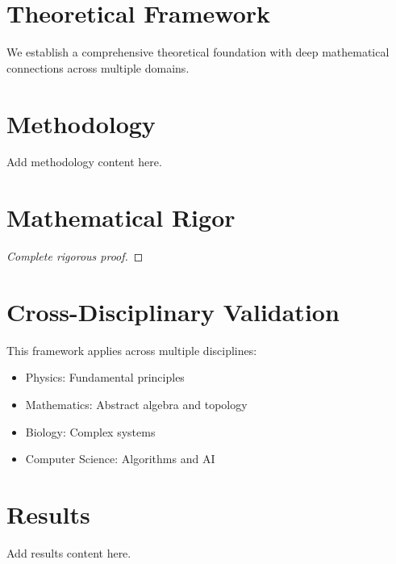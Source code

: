 \documentclass[11pt,a4paper]{article}
\begin{document}
\section{Theoretical Framework}

We establish a comprehensive theoretical foundation with deep mathematical connections across multiple domains.

\begin{theorem}
\end{theorem}

\section{Methodology}
\label{sec:methodology}

Add methodology content here.



\section{Mathematical Rigor}

\begin{theorem}
\end{theorem}

\begin{proof}
[Complete rigorous proof]
\end{proof}


\section{Cross-Disciplinary Validation}

This framework applies across multiple disciplines:
\begin{itemize}
    \item Physics: Fundamental principles
    \item Mathematics: Abstract algebra and topology
    \item Biology: Complex systems
    \item Computer Science: Algorithms and AI
\end{itemize}

\section{Results}
\label{sec:results}

Add results content here.
\end{document}
